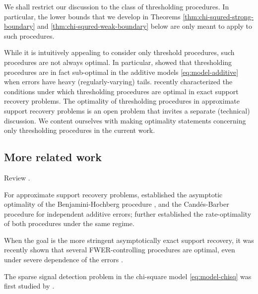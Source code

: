 We shall restrict our discussion to the class of thresholding procedures.
In particular, the lower bounds that we develop in Theorems \ref{thm:chi-squred-strong-boundary} and \ref{thm:chi-squred-weak-boundary} below are only meant to apply to such procedures.

\begin{remark}
While it is intuitively appealing to consider only threshold procedures, such procedures are not always optimal.
In particular, \citet{chen2018scan} showed that thresholding procedures are in fact sub-optimal in the additive models \eqref{eq:model-additive} when errors have heavy (regularly-varying) tails. 
\citet{gao2018fundamental} recently characterized the conditions under which thresholding procedures are optimal in exact support recovery problems.
The optimality of thresholding procedures in approximate support recovery problems is an open problem that invites a separate (technical) discussion. 
We content ourselves with making optimality statements concerning only thresholding procedures in the current work.
\end{remark}


\subsection{More related work}

Review \cite{jin2014optimality, jin2016rare, butucea2018variable, arias2017distribution, gao2018fundamental, ji2012ups, rabinovich2017optimal}.


For approximate support recovery problems, \citet*{arias2017distribution} established the asymptotic optimality of the Benjamini-Hochberg procedure \cite{benjamini1995controlling}, and the Cand\'es-Barber procedure \cite{barber2015controlling} for independent additive errors;
\citet{rabinovich2017optimal} further established the rate-optimality of both procedures under the same regime.

When the goal is the more stringent asymptotically exact support recovery, it was recently shown that several FWER-controlling procedures are optimal, even under severe dependence of the errors \cite{gao2018fundamental}.

The sparse signal detection problem in the chi-square model \eqref{eq:model-chisq} was first studied by \cite{donoho2004higher}.


\cite{gao2019upass}

